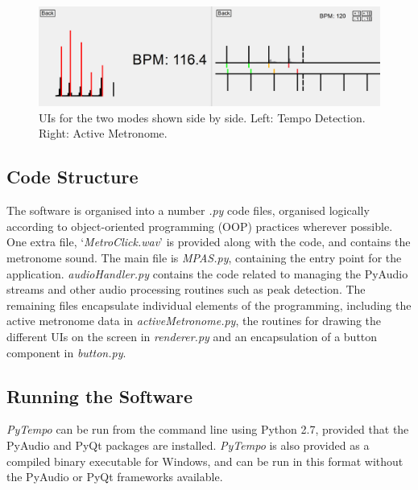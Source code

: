 \documentclass[hidelinks,12pt]{article}
\begin{document}
\begin{figure}[H]
	\begin{center}
		\includegraphics[scale=0.4]{UI.png}
		\caption{UIs for the two modes shown side by side. Left: Tempo Detection. Right: Active Metronome.}
		\label{fig:UIScreenshot}
	\end{center}
\end{figure}

\subsection{Code Structure}
The software is organised into a number \textit{.py} code files, organised logically according to object-oriented programming (OOP) practices wherever possible. One extra file, `\textit{MetroClick.wav}' is provided along with the code, and contains the metronome sound. The main file is \textit{MPAS.py}, containing the entry point for the application. \textit{audioHandler.py} contains the code related to managing the PyAudio streams and other audio processing routines such as peak detection. The remaining files encapsulate individual elements of the programming, including the active metronome data in \textit{activeMetronome.py}, the routines for drawing the different UIs on the screen in \textit{renderer.py} and an encapsulation of a button component in \textit{button.py}.

\subsection{Running the Software}
\textit{PyTempo} can be run from the command line using Python 2.7, provided that the PyAudio and PyQt packages are installed. \textit{PyTempo} is also provided as a compiled binary executable for Windows, and can be run in this format without the PyAudio or PyQt frameworks available.
\end{document}
